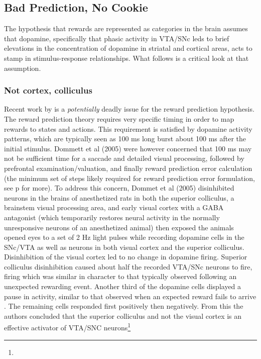 \subsection{Bad Prediction, No Cookie}
\label{sub:bad}
The hypothesis that rewards are represented as categories in the brain assumes that dopamine, specifically that phasic activity in VTA/SNc leds to brief elevations in the concentration of dopamine in striatal and cortical areas, acts to stamp in stimulus-response relationships.  What follows is a critical look at that assumption.

\subsubsection{Not cortex, colliculus}
\label{subsub:colliculus}
Recent work by \citet{Dommett:2005p7263} is a \emph{potentially} deadly issue for the reward prediction hypothesis.  The reward prediction theory requires very specific timing in order to map rewards to states and actions.  This requirement is satisfied by dopamine activity patterns, which are typically seen as 100 ms long burst about 100 ms after the initial stimulus.  Dommett et al (2005) were however concerned that 100 ms may not be sufficient time for a saccade and detailed visual processing, followed by prefrontal examination/valuation, and finally reward prediction error calculation (the minimum set of steps likely required for reward prediction error formulation, see p\pageref{subsub:fclt} for more).  To address this concern, Dommet et al (2005) disinhibited neurons in the brains of anesthetized rats in both the superior colliculus, a brainstem visual processing area, and early visual cortex with a GABA antagonist (which temporarily restores neural activity in the normally unresponsive neurons of an anesthetized animal) then exposed the animals opened eyes to a set of 2 Hz light pulses while recording dopamine cells in the SNc/VTA as well as neurons in both visual cortex and the superior colliculus.  Disinhibition of the visual cortex led to no change in dopamine firing.  Superior colliculus disinhibition caused about half the recorded  VTA/SNc neurons to fire, firing which was similar in character to that typically observed following an unexpected rewarding event.  Another third of the dopamine cells displayed a pause in activity, similar to that observed when an expected reward fails to arrive \citep{Mirenowicz:1994p7185}.  The remaining cells responded first positively then negatively.  From this the authors concluded that the superior colliculus and not the visual cortex is an effective activator of VTA/SNC neurons\footnote{
}
